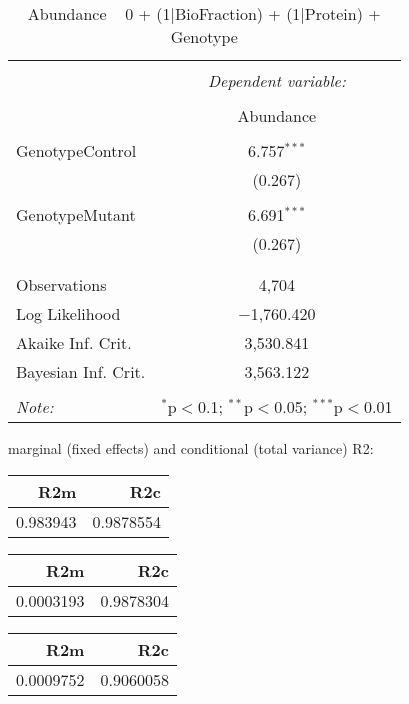 \documentclass[11pt]{report}
\begin{document}
\begin{table}[!htbp] \centering 
  \caption{Abundance ~ 0 + (1|BioFraction) + (1|Protein) + Genotype} 
  \label{} 
\begin{tabular}{@{\extracolsep{5pt}}lc} 
\\[-1.8ex]\hline 
\hline \\[-1.8ex] 
 & \multicolumn{1}{c}{\textit{Dependent variable:}} \\ 
\cline{2-2} 
\\[-1.8ex] & Abundance \\ 
\hline \\[-1.8ex] 
 GenotypeControl & 6.757$^{***}$ \\ 
  & (0.267) \\ 
  & \\ 
 GenotypeMutant & 6.691$^{***}$ \\ 
  & (0.267) \\ 
  & \\ 
\hline \\[-1.8ex] 
Observations & 4,704 \\ 
Log Likelihood & $-$1,760.420 \\ 
Akaike Inf. Crit. & 3,530.841 \\ 
Bayesian Inf. Crit. & 3,563.122 \\ 
\hline 
\hline \\[-1.8ex] 
\textit{Note:}  & \multicolumn{1}{r}{$^{*}$p$<$0.1; $^{**}$p$<$0.05; $^{***}$p$<$0.01} \\ 
\end{tabular} 
\end{table} 
marginal (fixed effects) and conditional (total variance) R2:

\begin{tabular}{r|r}
\hline
R2m & R2c\\
\hline
0.983943 & 0.9878554\\
\hline
\end{tabular}

\begin{tabular}{r|r}
\hline
R2m & R2c\\
\hline
0.0003193 & 0.9878304\\
\hline
\end{tabular}

\begin{tabular}{r|r}
\hline
R2m & R2c\\
\hline
0.0009752 & 0.9060058\\
\hline
\end{tabular}
\end{document}
